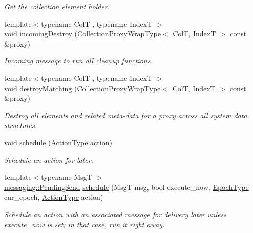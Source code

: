 \begin{DoxyCompactItemize}
\begin{DoxyCompactList}\small\item\em Get the collection element holder. \end{DoxyCompactList}\item 
{\footnotesize template$<$typename ColT , typename IndexT $>$ }\\void \hyperlink{structvt_1_1vrt_1_1collection_1_1_collection_manager_a79d8ce89b21670fe0d482646aca4a2a4}{incoming\+Destroy} (\hyperlink{structvt_1_1vrt_1_1collection_1_1_collection_manager_a56458ed7f9bb22b631b9b3a745f42f94}{Collection\+Proxy\+Wrap\+Type}$<$ ColT, IndexT $>$ const \&proxy)
\begin{DoxyCompactList}\small\item\em Incoming message to run all cleanup functions. \end{DoxyCompactList}\item 
{\footnotesize template$<$typename ColT , typename IndexT $>$ }\\void \hyperlink{structvt_1_1vrt_1_1collection_1_1_collection_manager_afac7551ce2ddeeff21631fa9e6987784}{destroy\+Matching} (\hyperlink{structvt_1_1vrt_1_1collection_1_1_collection_manager_a56458ed7f9bb22b631b9b3a745f42f94}{Collection\+Proxy\+Wrap\+Type}$<$ ColT, IndexT $>$ const \&proxy)
\begin{DoxyCompactList}\small\item\em Destroy all elements and related meta-\/data for a proxy across all system data structures. \end{DoxyCompactList}\item 
void \hyperlink{structvt_1_1vrt_1_1collection_1_1_collection_manager_a7199e829343abd7700dcdcd0a02cd477}{schedule} (\hyperlink{namespacevt_ae0a5a7b18cc99d7b732cb4d44f46b0f3}{Action\+Type} action)
\begin{DoxyCompactList}\small\item\em Schedule an action for later. \end{DoxyCompactList}\item 
{\footnotesize template$<$typename MsgT $>$ }\\\hyperlink{structvt_1_1messaging_1_1_pending_send}{messaging\+::\+Pending\+Send} \hyperlink{structvt_1_1vrt_1_1collection_1_1_collection_manager_aaa19d241c982123103147b568f97b842}{schedule} (MsgT msg, bool execute\+\_\+now, \hyperlink{namespacevt_a985a5adf291c34a3ca263b3378388236}{Epoch\+Type} cur\+\_\+epoch, \hyperlink{namespacevt_ae0a5a7b18cc99d7b732cb4d44f46b0f3}{Action\+Type} action)
\begin{DoxyCompactList}\small\item\em Schedule an action with an associated message for delivery later unless {\ttfamily execute\+\_\+now} is set; in that case, run it right away. \end{DoxyCompactList}\item 

\end{DoxyCompactItemize}
